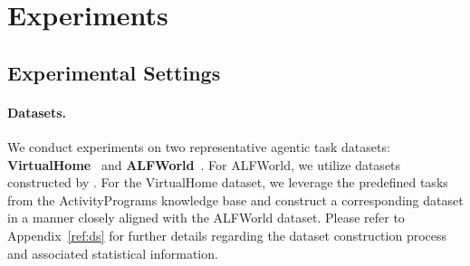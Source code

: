 \section{Experiments}

\subsection{Experimental Settings}

\paragraph{Datasets.}

We conduct experiments on two representative agentic task datasets: \textbf{VirtualHome}~\citep{puig2018virtualhome} and \textbf{ALFWorld}~\citep{shridhar2020alfworld}. 
For ALFWorld, we utilize datasets constructed by \citealp{song2024trial}. For the VirtualHome dataset, we leverage the predefined tasks from the ActivityPrograms knowledge base \citep{puig2018virtualhome} and construct a corresponding dataset in a manner closely aligned with the ALFWorld dataset.
Please refer to Appendix~\ref{ref:ds} for further details regarding the dataset construction process and associated statistical information.

